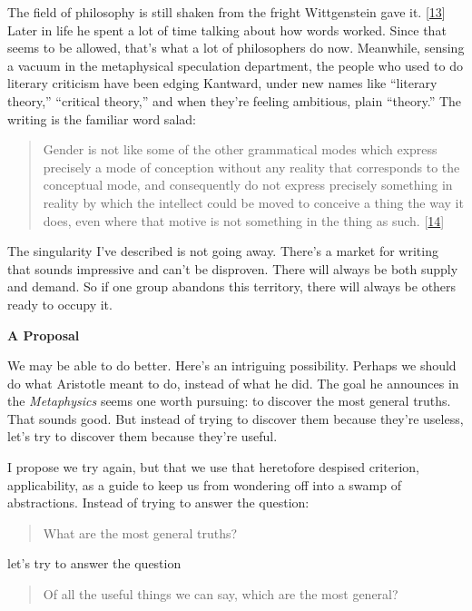 The field of philosophy is still shaken from the fright Wittgenstein
gave it. {[}\hyperref[f13n]{13}{]} Later in life he spent a lot of time
talking about how words worked. Since that seems to be allowed, that's
what a lot of philosophers do now. Meanwhile, sensing a vacuum in the
metaphysical speculation department, the people who used to do literary
criticism have been edging Kantward, under new names like ``literary
theory,'' ``critical theory,'' and when they're feeling ambitious, plain
``theory.'' The writing is the familiar word salad:

\begin{quote}
Gender is not like some of the other grammatical modes which express
precisely a mode of conception without any reality that corresponds to
the conceptual mode, and consequently do not express precisely something
in reality by which the intellect could be moved to conceive a thing the
way it does, even where that motive is not something in the thing as
such. {[}\hyperref[f14n]{14}{]}
\end{quote}

The singularity I've described is not going away. There's a market for
writing that sounds impressive and can't be disproven. There will always
be both supply and demand. So if one group abandons this territory,
there will always be others ready to occupy it.

\textbf{A Proposal}

We may be able to do better. Here's an intriguing possibility. Perhaps
we should do what Aristotle meant to do, instead of what he did. The
goal he announces in the \emph{Metaphysics} seems one worth pursuing: to
discover the most general truths. That sounds good. But instead of
trying to discover them because they're useless, let's try to discover
them because they're useful.

I propose we try again, but that we use that heretofore despised
criterion, applicability, as a guide to keep us from wondering off into
a swamp of abstractions. Instead of trying to answer the question:

\begin{quote}
What are the most general truths?
\end{quote}

let's try to answer the question

\begin{quote}
Of all the useful things we can say, which are the most general?
\end{quote}

